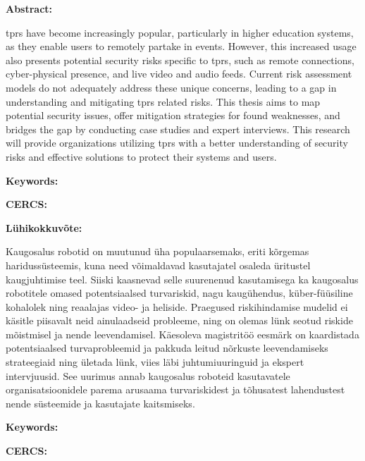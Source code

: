 
\newpage
\noindent\textbf{\large {\thesisTitle}}

\vspace*{3ex}

\noindent\textbf{Abstract:}
\vspace{-1ex}

\ac{tprs} have become increasingly popular, particularly
in higher education systems, as they enable users to remotely partake in
events. However, this increased usage also presents potential security risks
specific to \ac{tprs}, such as remote connections, cyber-physical presence, and
live video and audio feeds. Current risk assessment models do not adequately
address these unique concerns, leading to a gap in understanding and
mitigating \ac{tprs} related risks.
This thesis aims to map potential security issues, offer mitigation strategies for found weaknesses, and bridges the gap by
conducting case
studies and expert interviews.
This research will provide organizations utilizing \ac{tprs} with a
better understanding of security risks and effective solutions to protect
their systems and users.

\vspace*{1ex}

\noindent\textbf{Keywords:}
\vspace{-1ex}
{\thesisKeywordsEng}
\vspace*{1ex}

\noindent\textbf{CERCS:}
\vspace{-1ex}
{\thesisCERCSEng}
\vspace*{3ex}

\noindent\textbf{\large {\thesisTitleEst}}
\vspace*{1ex}

\noindent\textbf{Lühikokkuvõte:}
\vspace{-1ex}

Kaugosalus robotid on muutunud üha populaarsemaks, eriti kõrgemas haridussüsteemis, kuna need võimaldavad kasutajatel osaleda üritustel
kaugjuhtimise teel. Siiski kaasnevad selle suurenenud kasutamisega ka kaugosalus robotitele omased potentsiaalsed turvariskid, nagu
kaugühendus, küber-füüsiline kohalolek ning reaalajas video- ja heliside. Praegused riskihindamise mudelid ei käsitle
piisavalt neid ainulaadseid probleeme, ning on olemas lünk seotud riskide mõistmisel ja nende leevendamisel.
Käesoleva magistritöö eesmärk on kaardistada potentsiaalsed turvaprobleemid ja pakkuda leitud nõrkuste leevendamiseks strateegiaid ning
ületada lünk, viies läbi juhtumiuuringuid ja ekspert intervjuusid. See uurimus annab kaugosalus roboteid kasutavatele organisatsioonidele
parema arusaama turvariskidest ja tõhusatest lahendustest nende süsteemide ja kasutajate kaitsmiseks.
\vspace*{1ex}

\noindent\textbf{Keywords:}
\vspace{-1ex}
{\thesisKeywordsEst}
\vspace*{1ex}

\noindent\textbf{CERCS:}
\vspace{-1ex}
{\thesisCERCSEst}
